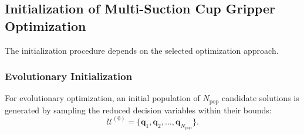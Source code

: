 

\subsection{Initialization of Multi-Suction Cup Gripper Optimization}

The initialization procedure depends on the selected optimization approach.

\subsubsection{Evolutionary Initialization}

For evolutionary optimization, an initial population of $N_{\mathrm{pop}}$ candidate solutions is
generated by sampling the reduced decision variables within their bounds:
\begin{equation}
    \mathcal{U}^{(0)}
    =
    \{\mathbf{q}_1,\mathbf{q}_2,\dots,\mathbf{q}_{N_{\mathrm{pop}}}\}.
\end{equation}

